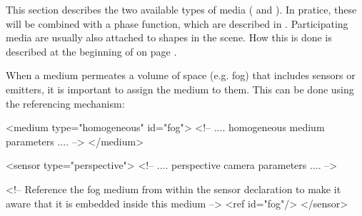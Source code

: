 This section describes the two available types of media
( and ). In pratice, these
will be combined with a phase function, which are described in .
Participating media are usually also attached to shapes in the scene.
How this is done is described at the beginning of  on page
\pageref{sec:shapes}.

When a medium permeates a volume of space (e.g. fog) that includes sensors or emitters,
it is important to assign the medium to them. This can be done using the
referencing mechanism:

\begin{xml}
<medium type="homogeneous" id="fog">
	<!-- .... homogeneous medium parameters .... -->
</medium>

<sensor type="perspective">
	<!-- .... perspective camera parameters .... -->

	<!-- Reference the fog medium from within the sensor declaration
	     to make it aware that it is embedded inside this medium -->
	<ref id="fog"/>
</sensor>
\end{xml}
